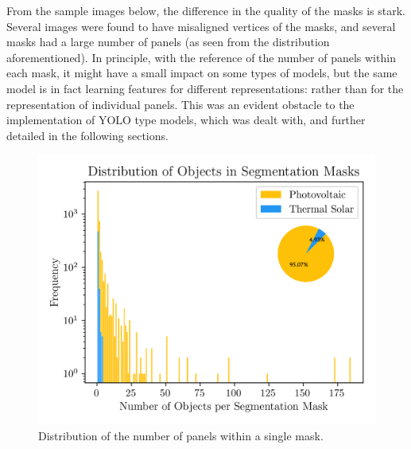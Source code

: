 \documentclass[conference]{IEEEtran}
\begin{document}
From the sample images below, the difference in the quality of the masks is stark. Several images were found to have misaligned vertices of the masks, and several masks had a large number of panels (as seen from the distribution aforementioned). In principle, with the reference of the number of panels within each mask, it might have a small impact on some types of models, but the same model is in fact learning features for different representations: rather than for the representation of individual panels. This was an evident obstacle to the implementation of YOLO type models, which was dealt with, and further detailed in the following sections.

\begin{figure}[H]
    \centering
    \includegraphics[width=1\linewidth]{assets/data_objectdistribution_ph.png}
    \caption{Distribution of the number of panels within a single mask.}
    \label{fig:data_objectdistribution}
\end{figure}
\end{document}
